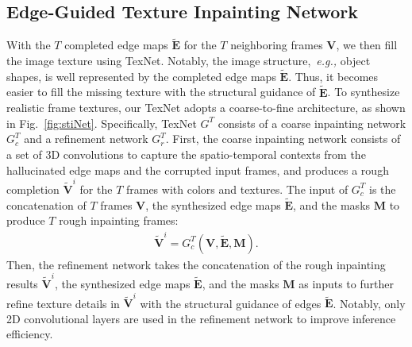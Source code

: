 \subsection{Edge-Guided Texture Inpainting Network}

 
With the $T$ completed edge maps $\boldsymbol{\widetilde{E}}$ for the $T$ neighboring frames $\boldsymbol{V}$, we then fill the image texture using TexNet.
Notably, the image structure,~\emph{e.g.,} object shapes, is well represented by the completed edge maps $\boldsymbol{\widetilde{E}}$.
Thus, it becomes easier to fill the missing texture with the structural guidance of $\boldsymbol{\widetilde{E}}$.
%
To synthesize realistic frame textures, our TexNet adopts a coarse-to-fine architecture, as shown in Fig.~\ref{fig:stiNet}.
Specifically, TexNet {\color{blue}$G^T$} consists of a coarse inpainting network {\color{blue}$G_c^T$} and a refinement network {\color{blue}$G_r^T$}.
%
First, the coarse inpainting network consists of a set of 3D convolutions to capture the spatio-temporal contexts from the hallucinated edge maps and the corrupted input frames, and produces a rough completion $\boldsymbol{\widetilde{V}}^i$ for the $T$ frames with colors and textures. {\color{blue}The input of $G^T_c$ is the concatenation of $T$ frames $\boldsymbol{V}$, the synthesized edge maps $\boldsymbol{\widetilde{E}}$, and the masks $\boldsymbol{M}$ to produce $T$ rough inpainting frames:}
{\color{blue}
	\begin{equation}
	\begin{aligned}
	\label{eq:coarsenet}
	\boldsymbol{\widetilde{V}}^i=G_{c}^T(\boldsymbol{V},\boldsymbol{\widetilde{E}},\boldsymbol{M}).
	\end{aligned}
	\end{equation}
}
Then, the refinement network takes {\color{blue}the concatenation of} the rough inpainting results $\boldsymbol{\widetilde{V}}^i$, the synthesized edge maps $\boldsymbol{\widetilde{E}}$, and the masks $\boldsymbol{M}$ as inputs to further refine texture details in $\boldsymbol{\widetilde{V}}^i$ with the structural guidance of edges $\boldsymbol{\widetilde{E}}$. 
Notably, only 2D convolutional layers are used in the refinement network to improve inference efficiency. 
